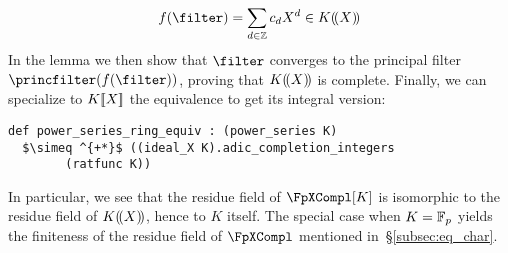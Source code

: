 \documentclass[sigplan,10pt,anonymous,review]{acmart}
\begin{document}
\[
f(\filter)=\sum_{d\in\ZZ} c_dX^d\in\laurentseries[K]
\]
In the lemma \href{https://github.com/LCFT-Lean/local_fields/blob/76ad487d09babdb0018f394a5634526637ee014a/src/laurent_series_equiv_adic_completion.lean#L625}{\extlink} we then show that $\filter$ converges to the principal filter $\princfilter(f(\filter))$, proving that $\laurentseries[K]$ is complete. Finally, we can specialize to $\powerseries[K]$ the equivalence 
to get its integral version:\href{https://github.com/LCFT-Lean/local_fields/blob/76ad487d09babdb0018f394a5634526637ee014a/src/laurent_series_equiv_adic_completion.lean#L978}{\extlink}
\begin{lstlisting}[caption={The isomorphism between power series and the unit ball in the completion of rational functions}, label={code:iso_ps}]
def power_series_ring_equiv : (power_series K) 
  $\simeq ^{+*}$ ((ideal_X K).adic_completion_integers 
        (ratfunc K))
\end{lstlisting}
In particular, we see that the residue field of $\FpXCompl[K]$ is isomorphic to the residue field of $\laurentseries[K]$, hence to $K$ itself. The special case when $K=\FF$ yields the finiteness of the residue field of $\FpXCompl$ mentioned in~\S\ref{subsec:eq_char}.
\end{document}
